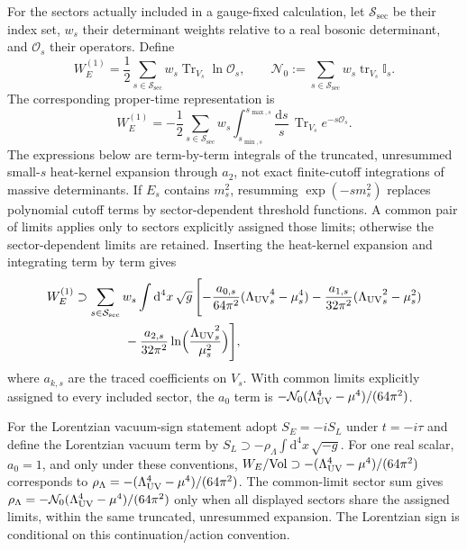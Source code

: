 For the sectors actually included in a gauge-fixed calculation, let
\(\mathcal{S}_{\mathrm{sec}}\) be their index set, \(w_s\) their determinant weights
relative to a real bosonic determinant, and \(\mathcal O_s\) their
operators. Define
\begin{equation}
  \label{eq:appA-sector-sum}
  W_E^{(1)}
  =\frac12\sum_{s\in\mathcal{S}_{\mathrm{sec}}}w_s
        \operatorname{Tr}_{V_s}\ln\mathcal O_s,
  \qquad
  \mathcal N_0
  :=\sum_{s\in\mathcal{S}_{\mathrm{sec}}}w_s
        \operatorname{tr}_{V_s}\mathbb I_s .
\end{equation}
The corresponding proper-time representation is
\begin{equation}
  \label{eq:appA-W}
  W_E^{(1)}
  =-\frac12\sum_{s\in\mathcal{S}_{\mathrm{sec}}}w_s
    \int_{s_{\min,s}}^{s_{\max,s}}\frac{\mathrm{d}s}{s}\,
    \operatorname{Tr}_{V_s}e^{-s\mathcal O_s}.
\end{equation}
The expressions below are term-by-term integrals of the truncated,
unresummed small-\(s\) heat-kernel expansion through \(a_2\), not
exact finite-cutoff integrations of massive determinants. If \(E_s\)
contains \(m_s^2\), resumming \(\exp(-s m_s^2)\) replaces polynomial
cutoff terms by sector-dependent threshold functions. A common pair of
limits applies only to sectors explicitly assigned those limits;
otherwise the sector-dependent limits are retained. Inserting the
heat-kernel expansion and integrating term by term gives
\begin{equation}
  \label{eq:appA-Wexp}
  \begin{aligned}
      W_E^{(1)}
      &\supset
      \sum_{s\in\mathcal{S}_{\mathrm{sec}}}w_s
      \int\mathrm{d}^4x\,\sqrt{g}\,
      \Biggl[
        -\frac{a_{0,s}}{64\pi^2}
          ({\Lambda_{\mathrm{UV}}}_s^4-\mu_s^4)
        -\frac{a_{1,s}}{32\pi^2}
          ({\Lambda_{\mathrm{UV}}}_s^2-\mu_s^2)\\
      &\qquad\qquad
        -\frac{a_{2,s}}{32\pi^2}
          \ln\Bigl(\frac{{\Lambda_{\mathrm{UV}}}_s^2}{\mu_s^2}\Bigr)
      \Biggr],
  \end{aligned}
\end{equation}
where \(a_{k,s}\) are the traced coefficients on \(V_s\). With common
limits explicitly assigned to every included sector, the \(a_0\) term
is \(-\mathcal N_0(\Lambda_{\mathrm{UV}}^4-\mu^4)/(64\pi^2)\).

For the Lorentzian vacuum-sign statement adopt \(S_E=-iS_L\) under
\(t=-i\tau\) and define the Lorentzian vacuum term by
\(S_L\supset-\rho_\Lambda\int\mathrm{d}^4x\,\sqrt{-g}\).
For one real scalar, \(a_0=1\), and only under these conventions,
\(W_E/\mathrm{Vol}\supset-(\Lambda_{\mathrm{UV}}^4-\mu^4)/(64\pi^2)\) corresponds to
\(\rho_\Lambda=-(\Lambda_{\mathrm{UV}}^4-\mu^4)/(64\pi^2)\). The common-limit sector
sum gives \(\rho_\Lambda=-\mathcal N_0(\Lambda_{\mathrm{UV}}^4-\mu^4)/(64\pi^2)\)
only when all displayed sectors share the assigned limits, within the
same truncated, unresummed expansion. The Lorentzian sign is
conditional on this continuation/action convention.

